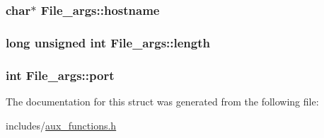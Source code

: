 \subsubsection[{\texorpdfstring{hostname}{hostname}}]{\setlength{\rightskip}{0pt plus 5cm}char$\ast$ File\+\_\+args\+::hostname}\hypertarget{struct_file__args_a9aa177aea3a099397a09131a92f30115}{}\label{struct_file__args_a9aa177aea3a099397a09131a92f30115}
\subsubsection[{\texorpdfstring{length}{length}}]{\setlength{\rightskip}{0pt plus 5cm}long unsigned int File\+\_\+args\+::length}\hypertarget{struct_file__args_a3168e8734e7ad263d88a6da49b4aff20}{}\label{struct_file__args_a3168e8734e7ad263d88a6da49b4aff20}
\subsubsection[{\texorpdfstring{port}{port}}]{\setlength{\rightskip}{0pt plus 5cm}int File\+\_\+args\+::port}\hypertarget{struct_file__args_a83e78eb2ebacdc7e63eca61d1340fa61}{}\label{struct_file__args_a83e78eb2ebacdc7e63eca61d1340fa61}


The documentation for this struct was generated from the following file\+:\begin{DoxyCompactItemize}
\item 
includes/\hyperlink{aux__functions_8h}{aux\+\_\+functions.\+h}\end{DoxyCompactItemize}
